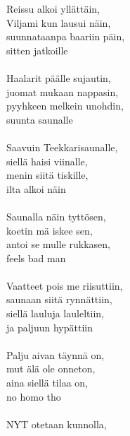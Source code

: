 
            Reissu alkoi yllättäin,  \\
            Viljami kun lausui näin,  \\
            suunnataanpa baariin päin,  \\
            sitten jatkoille \\
\hspace{10mm} \\
            Haalarit päälle sujautin,  \\
            juomat mukaan nappasin,  \\
            pyyhkeen melkein unohdin, \\
            suunta saunalle \\
\hspace{10mm} \\
            Saavuin Teekkarisaunalle,  \\
            siellä haisi viinalle,  \\
            menin siitä tiskille,  \\
            ilta alkoi näin \\
\hspace{10mm} \\
            Saunalla näin tyttösen,  \\
            koetin mä iskee sen,  \\
            antoi se mulle rukkasen,  \\
            feels bad man \\
\hspace{10mm} \\
            Vaatteet pois me riisuttiin,  \\
            saunaan siitä rynnättiin,  \\
            siellä lauluja lauleltiin,  \\
            ja paljuun hypättiin \\
\hspace{10mm} \\
            Palju aivan täynnä on,  \\
            mut älä ole onneton,  \\
            aina siellä tilaa on,  \\
            no homo tho \\
\hspace{10mm} \\
            NYT otetaan kunnolla, \\
